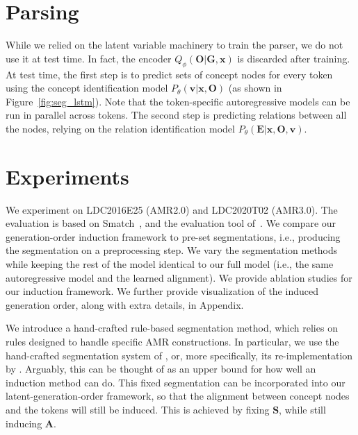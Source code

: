 \documentclass[11pt]{article}
\begin{document}
\section{Parsing}
\label{sec:parsing}

While we relied on the latent variable machinery to train the parser, we do not use it at test time. In fact, the encoder $Q_\phi(\mathbf{O}|\mathbf{G},\mathbf{x})$ is discarded after training. At test time, the first step is to predict sets of concept nodes for every token using the concept identification model $P_\theta(\mathbf{v}|\mathbf{x},\mathbf{O})$ (as shown in Figure~\ref{fig:seg_lstm}). Note that the token-specific autoregressive models can be run in parallel across tokens. The second step is predicting relations between all the nodes, relying on the relation identification model $P_\theta(\mathbf{E}|\mathbf{x},\mathbf{O},\mathbf{v}) $. 



\section{Experiments} 

We experiment on LDC2016E25 (AMR2.0) and 
LDC2020T02 (AMR3.0).  \nocite{Cai2013SmatchAE}
The evaluation is  based on Smatch~\cite{Cai2013SmatchAE}, and the evaluation tool of~.  
We compare
our generation-order induction framework to pre-set segmentations, i.e., producing the segmentation on a preprocessing step.  We vary the segmentation methods while keeping the rest of the model identical to our full model (i.e., the same autoregressive model and the learned alignment). We provide ablation studies for our induction framework. We further provide visualization of the induced generation order, along with extra details, in Appendix. 


\vspace{1ex}
  \label{sec:fixed-seg} \quad
We introduce a hand-crafted rule-based segmentation method, which relies on rules designed to handle specific AMR constructions. In particular, we use the hand-crafted segmentation system of  , or, more specifically, its re-implementation by .  
Arguably, this can be thought of as an upper bound for how well an induction method can do.
This fixed segmentation can be  incorporated into our  latent-generation-order framework, so that the alignment  between concept nodes and the tokens will still be induced. This is achieved by fixing $\mathbf{S}$, while still inducing $\mathbf{A}$.
\end{document}
